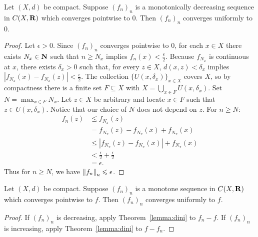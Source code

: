 \documentclass[12pt,twoside,openany]{memoir}
\begin{document}
    \begin{theorem}\label{lemma:dini}
        Let $(X,d)$ be compact. Suppose $(f_n)_n$ is a monotonically decreasing sequence in $C(X,\mathbf{R})$ which converges pointwise to $0$. Then $(f_n)_n$ converges uniformly to $0$.
    \end{theorem}
        \begin{proof}
            Let $\epsilon > 0$. Since $(f_n)_n$ converges pointwise to $0$, for each $x \in X$ there exists $N_x \in \mathbf{N}$ such that $n \geq N_x$ implies $f_n(x) < \frac{\epsilon}{2}$. Because $f_{N_x}$ is continuous at $x$, there exists $\delta_x > 0$ such that, for every $z \in X$, $d(x,z) < \delta_x$ implies $|f_{N_x}(x) - f_{N_x}(z)| < \frac{\epsilon}{2}$. The collection $\{U(x,\delta_x)\}_{x \in X}$ covers $X$, so by compactness there is a finite set $F \subseteq X$ with $X = \bigcup_{x \in F} U(x,\delta_x)$. Set $N = \max_{x \in F} N_x$. Let $z \in X$ be arbitrary and locate $x \in F$ such that $z \in U(x,\delta_x)$. Notice that our choice of $N$ does not depend on $z$. For $n \geq N$:
                \begin{equation*}
                \begin{split}
                    f_n(z) 
                    & \leq f_{N_x}(z) \\
                    & = f_{N_x}(z) - f_{N_x}(x) + f_{N_x}(x) \\
                    & \leq |f_{N_x}(z) - f_{N_x}(x)| + f_{N_x}(x) \\
                    & < \frac{\epsilon}{2} + \frac{\epsilon}{2} \\
                    & = \epsilon.
                \end{split}
                \end{equation*}
            Thus for $n \geq N$, we have $\left\lVert f_n \right\rVert_u \leqslant \epsilon$.
        \end{proof}

    \begin{theorem}
        Let $(X,d)$ be compact. Suppose $(f_n)_n$ is a monotone sequence in $C(X,\mathbf{R})$ which converges pointwise to $f$. Then $(f_n)_n$ converges uniformly to $f$.
    \end{theorem}
        \begin{proof}
            If $(f_n)_n$ is decreasing, apply Theorem~\ref{lemma:dini} to $f_n - f$. If $(f_n)_n$ is increasing, apply Theorem~\ref{lemma:dini} to $f - f_n$.
        \end{proof}
\end{document}
